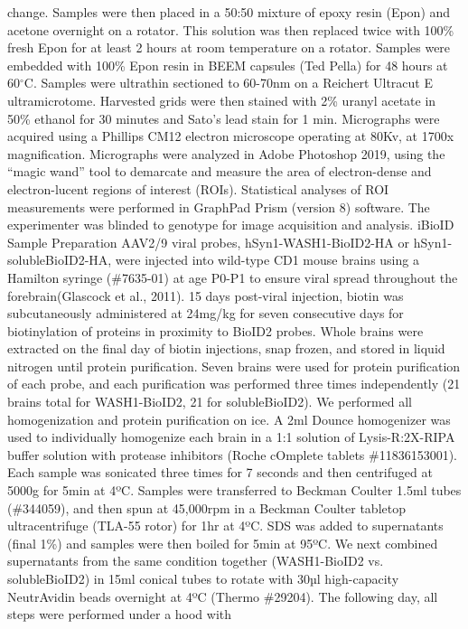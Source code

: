 change. Samples were then placed in a 50:50 mixture of epoxy resin (Epon) and
acetone overnight on a rotator. This solution was then replaced twice with 100\%
fresh Epon for at least 2 hours at room temperature on a rotator. Samples were
embedded with 100\% Epon resin in BEEM capsules (Ted Pella) for 48 hours at 60$^{\circ}$C.
Samples were ultrathin sectioned to 60-70nm on a Reichert Ultracut E
ultramicrotome. Harvested grids were then stained with 2\% uranyl acetate in 50\%
ethanol for 30 minutes and Sato’s lead stain for 1 min. Micrographs were
acquired using a Phillips CM12 electron microscope operating at 80Kv, at 1700x
magnification. Micrographs were analyzed in Adobe Photoshop 2019, using the
“magic wand” tool to demarcate and measure the area of electron-dense and
electron-lucent regions of interest (ROIs). Statistical analyses of ROI
measurements were performed in GraphPad Prism (version 8) software. The
experimenter was blinded to genotype for image acquisition and analysis. 
iBioID Sample Preparation
AAV2/9 viral probes, hSyn1-WASH1-BioID2-HA or hSyn1-solubleBioID2-HA, were
injected into wild-type CD1 mouse brains using a Hamilton syringe (\#7635-01) at
age P0-P1 to ensure viral spread throughout the forebrain(Glascock et al.,
2011). 15 days post-viral injection, biotin was subcutaneously administered at
24mg/kg for seven consecutive days for biotinylation of proteins in proximity to
BioID2 probes. Whole brains were extracted on the final day of biotin
injections, snap frozen, and stored in liquid nitrogen until protein
purification. Seven brains were used for protein purification of each probe, and
each purification was performed three times independently (21 brains total for
WASH1-BioID2, 21 for solubleBioID2).
We performed all homogenization and protein purification on ice. A 2ml Dounce
homogenizer was used to individually homogenize each brain in a 1:1 solution of
Lysis-R:2X-RIPA buffer solution with protease inhibitors (Roche cOmplete tablets
\#11836153001). Each sample was sonicated three times for 7 seconds and then
centrifuged at 5000g for 5min at 4ºC. Samples were transferred to Beckman
Coulter 1.5ml tubes (\#344059), and then spun at 45,000rpm in a Beckman Coulter
tabletop ultracentrifuge (TLA-55 rotor) for 1hr at 4ºC. SDS was added to
supernatants (final 1\%) and samples were then boiled for 5min at 95ºC. We next
combined supernatants from the same condition together (WASH1-BioID2 vs.
solubleBioID2) in 15ml conical tubes to rotate with 30µl high-capacity
NeutrAvidin beads overnight at 4ºC (Thermo \#29204).
	The following day, all steps were performed under a hood with
